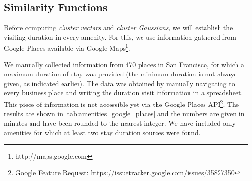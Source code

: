 \documentclass{ws-ijait}
\begin{document}
		\subsection{Similarity Functions}
		Before computing \textit{cluster vectors} and \textit{cluster Gaussians}, we will establish the visiting duration in every amenity.
		For this, we use information gathered from Google Places available via Google Maps\footnote{http://maps.google.com}.
		
		We manually collected information from 470 places in San Francisco, for which a maximum duration of stay was provided (the minimum duration is not always given, as indicated earlier).
		The data was obtained by manually navigating to every business place and writing the duration visit information in a spreadsheet.
		This piece of information is not accessible yet via the Google Places API\footnote{Google Feature Request: \url{https://issuetracker.google.com/issues/35827350}}.
		The results are shown in \cref{tab:amenities_google_places} and the numbers are given in minutes and have been rounded to the nearest integer. We have included only amenities for which at least two stay duration sources were found. 
		
\end{document}
